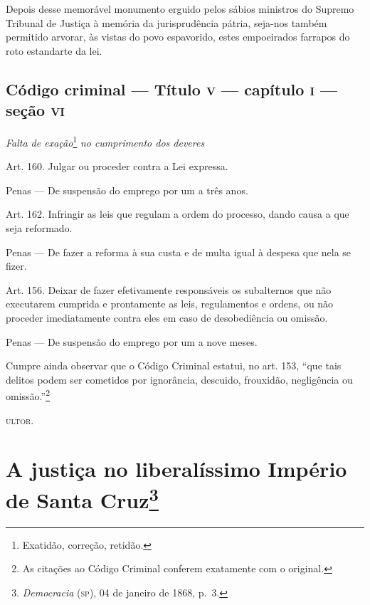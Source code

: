 Depois desse memorável monumento erguido pelos sábios ministros do
Supremo Tribunal de Justiça à memória da jurisprudência pátria, seja-nos
também permitido arvorar, às vistas do povo espavorido, estes
empoeirados farrapos do roto estandarte da lei.

\section{Código criminal --- Título \textsc{v} --- capítulo \textsc{i} --- seção \textsc{vi}}

\emph{Falta de exação}\footnote{Exatidão, correção, retidão.} \emph{no
cumprimento dos deveres}

Art. 160. Julgar ou proceder contra a Lei expressa.

Penas --- De suspensão do emprego por um a três anos.

Art. 162. Infringir as leis que regulam a ordem do processo, dando causa
a que seja reformado.

Penas --- De fazer a reforma à sua custa e de multa igual à despesa que
nela se fizer.

Art. 156. Deixar de fazer efetivamente responsáveis os subalternos que
não executarem cumprida e prontamente as leis, regulamentos e ordens, ou
não proceder imediatamente contra eles em caso de desobediência ou
omissão.

Penas --- De suspensão do emprego por um a nove meses.

Cumpre ainda observar que o Código Criminal estatui, no art. 153, ``que
tais delitos podem ser cometidos por ignorância, descuido, frouxidão,
negligência ou omissão.''\footnote{As citações ao Código Criminal
  conferem exatamente com o original.}

\textsc{ultor}.

\chapter{A justiça no liberalíssimo Império de Santa Cruz\footnote{\emph{Democracia} (\textsc{sp}), 04 de janeiro de 1868, p.~3.}}

